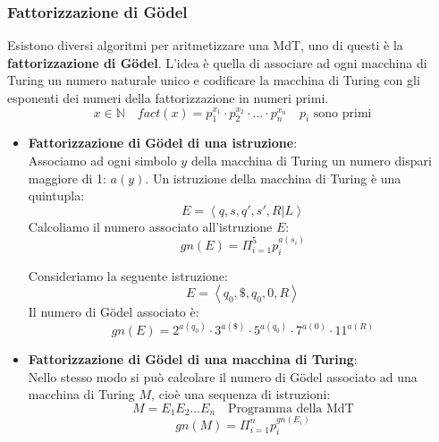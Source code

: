 \documentclass[a4paper]{article}
\begin{document}
\subsubsection{Fattorizzazione di Gödel}
Esistono diversi algoritmi per aritmetizzare una MdT, uno di questi è la
\textbf{fattorizzazione di Gödel}. L'idea è quella di associare ad ogni macchina di
Turing un numero naturale unico e codificare la macchina di Turing con gli esponenti
dei numeri della fattorizzazione in numeri primi.
\[
  x \in \mathbb{N} \quad fact(x) = p_1^{x_1} \cdot p_2^{x_2} \cdot \ldots \cdot p_n^{x_n}
  \quad p_i \text{ sono primi}
\] 

\begin{itemize}
  \item \textbf{Fattorizzazione di Gödel di una istruzione}:\\
    Associamo ad ogni simbolo \( y \) della macchina di Turing un numero dispari maggiore di
    1: \( a(y) \). Un istruzione della macchina di Turing è una quintupla:
    \[
      E = \left< q, s, q', s', R | L \right>
    \] 
    Calcoliamo il numero associato all'istruzione \( E \):
    \[
      gn(E) = \Pi_{i=1}^{5} p_i^{a(s_i)}
    \] 
    \begin{example}
      Consideriamo la seguente istruzione:
      \[
        E = \left< q_0, \$, q_0, 0, R \right>
      \] 
      Il numero di Gödel associato è:
      \[
        gn(E) = 2^{a(q_0)} \cdot 3^{a(\$)} \cdot 5^{a(q_0)} \cdot 7^{a(0)} \cdot 11^{a(R)}
      \] 
    \end{example}

  \item \textbf{Fattorizzazione di Gödel di una macchina di Turing}:\\
    Nello stesso modo si può calcolare il numero di Gödel associato ad una macchina di
    Turing \( M \), cioè una sequenza di istruzioni:
    \[
      M = E_1 E_2 \ldots E_n \quad \text{Programma della MdT}
    \] 
    \[
      gn(M) = \Pi_{i=1}^{n} p_i^{gn(E_i)}
    \] 


\end{itemize}
\end{document}
